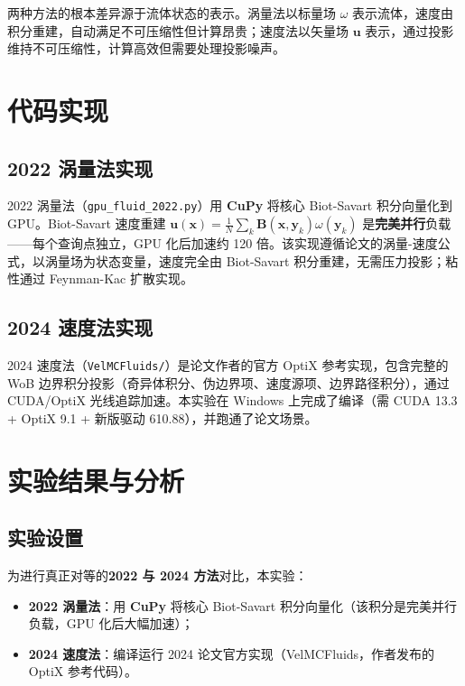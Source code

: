 \documentclass[12pt,a4paper]{article}
\begin{document}
两种方法的根本差异源于流体状态的表示。涡量法以标量场 $\omega$ 表示流体，速度由积分重建，自动满足不可压缩性但计算昂贵；速度法以矢量场 $\boldsymbol{u}$ 表示，通过投影维持不可压缩性，计算高效但需要处理投影噪声。

\section{代码实现}

\subsection{2022 涡量法实现}

2022 涡量法（\texttt{gpu\_fluid\_2022.py}）用 \textbf{CuPy} 将核心 Biot-Savart 积分向量化到 GPU。Biot-Savart 速度重建 $\boldsymbol{u}(\boldsymbol{x}) = \frac{1}{N}\sum_k \boldsymbol{B}(\boldsymbol{x},\boldsymbol{y}_k)\omega(\boldsymbol{y}_k)$ 是\textbf{完美并行}负载——每个查询点独立，GPU 化后加速约 120 倍。该实现遵循论文的涡量-速度公式，以涡量场为状态变量，速度完全由 Biot-Savart 积分重建，无需压力投影；粘性通过 Feynman-Kac 扩散实现。

\subsection{2024 速度法实现}

2024 速度法（\texttt{VelMCFluids/}）是论文作者的官方 OptiX 参考实现，包含完整的 WoB 边界积分投影（奇异体积分、伪边界项、速度源项、边界路径积分），通过 CUDA/OptiX 光线追踪加速。本实验在 Windows 上完成了编译（需 CUDA 13.3 + OptiX 9.1 + 新版驱动 610.88），并跑通了论文场景。

\section{实验结果与分析}

\subsection{实验设置}

为进行真正对等的\textbf{2022 与 2024 方法}对比，本实验：
\begin{itemize}
    \item \textbf{2022 涡量法}：用 \textbf{CuPy} 将核心 Biot-Savart 积分向量化（该积分是完美并行负载，GPU 化后大幅加速）；
    \item \textbf{2024 速度法}：编译运行 2024 论文官方实现（VelMCFluids，作者发布的 OptiX 参考代码）。
\end{itemize}
\end{document}
